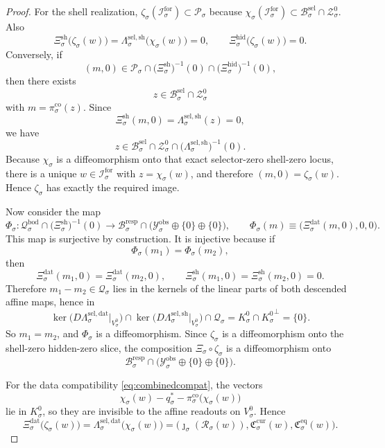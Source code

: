 \documentclass[11pt]{article}
\newcommand{\ForSpace}[1]{\mathcal I_{#1}^{\mathrm{for}}}
\newcommand{\Reduction}[1]{\mathcal R_{#1}}
\newcommand{\CurrentCarrier}[1]{\mathfrak C_{#1}^{\mathrm{cur}}}
\newcommand{\EqCarrier}[1]{\mathfrak C_{#1}^{\mathrm{eq}}}
\newcommand{\DataSpace}[1]{\mathcal Y_{#1}^{\mathrm{obs}}}
\newcommand{\ProtoBody}[1]{\mathcal P_{#1}}
\newcommand{\ResponseMap}[1]{\Xi_{#1}}
\newcommand{\ResponseData}[1]{\Xi_{#1}^{\mathrm{dat}}}
\newcommand{\ResponseShell}[1]{\Xi_{#1}^{\mathrm{sh}}}
\newcommand{\ResponseHidden}[1]{\Xi_{#1}^{\mathrm{hid}}}
\newcommand{\ResponseImage}[1]{\mathcal B_{#1}^{\mathrm{resp}}}
\newcommand{\ProtoEmbed}[1]{\zeta_{#1}}
\newcommand{\GenBody}[1]{\mathcal B_{#1}^{\mathrm{sel}}}
\newcommand{\GenData}[1]{\Lambda_{#1}^{\mathrm{sel,dat}}}
\newcommand{\GenShell}[1]{\Lambda_{#1}^{\mathrm{sel,sh}}}
\newcommand{\ZeroHiddenSlice}[1]{\mathcal Z_{#1}^{0}}
\newcommand{\ZeroHiddenVec}[1]{V_{#1}^{0}}
\newcommand{\GenEmbed}[1]{\chi_{#1}}
\newcommand{\Kernel}[1]{K_{#1}^{0}}
\newcommand{\CoreState}[1]{\mathcal Q_{#1}}
\newcommand{\ReferencePoint}[1]{q_{#1}^{\ast}}
\newcommand{\CoreCoord}[1]{\pi_{#1}^{\mathrm{co}}}
\newcommand{\CoreBody}[1]{\mathcal Q_{#1}^{\mathrm{bod}}}
\begin{document}
\begin{proof}
For the shell realization, \(\ProtoEmbed{\sigma}(\ForSpace{\sigma})\subset\ProtoBody{\sigma}\) because \(\GenEmbed{\sigma}(\ForSpace{\sigma})\subset\GenBody{\sigma}\cap\ZeroHiddenSlice{\sigma}\). Also
\[
\ResponseShell{\sigma}\bigl(\ProtoEmbed{\sigma}(w)\bigr)
=
\GenShell{\sigma}\bigl(\GenEmbed{\sigma}(w)\bigr)
=
0,
\qquad
\ResponseHidden{\sigma}\bigl(\ProtoEmbed{\sigma}(w)\bigr)=0.
\]
Conversely, if
\[
(m,0)\in
\ProtoBody{\sigma}\cap
\bigl(\ResponseShell{\sigma}\bigr)^{-1}(0)\cap
\bigl(\ResponseHidden{\sigma}\bigr)^{-1}(0),
\]
then there exists
\[
z\in\GenBody{\sigma}\cap\ZeroHiddenSlice{\sigma}
\]
with \(m=\CoreCoord{\sigma}(z)\). Since
\[
\ResponseShell{\sigma}(m,0)
=
\GenShell{\sigma}(z)
=
0,
\]
we have
\[
z\in
\GenBody{\sigma}\cap
\ZeroHiddenSlice{\sigma}\cap
\bigl(\GenShell{\sigma}\bigr)^{-1}(0).
\]
Because \(\GenEmbed{\sigma}\) is a diffeomorphism onto that exact selector-zero shell-zero locus, there is a unique \(w\in\ForSpace{\sigma}\) with \(z=\GenEmbed{\sigma}(w)\), and therefore \((m,0)=\ProtoEmbed{\sigma}(w)\). Hence \(\ProtoEmbed{\sigma}\) has exactly the required image.

Now consider the map
\[
\Phi_{\sigma}:
\CoreBody{\sigma}\cap
\bigl(\ResponseShell{\sigma}\bigr)^{-1}(0)
\to
\ResponseImage{\sigma}\cap
\bigl(
\DataSpace{\sigma}\oplus\{0\}\oplus\{0\}
\bigr),
\qquad
\Phi_{\sigma}(m)
\equiv
\bigl(
\ResponseData{\sigma}(m,0),
0,
0
\bigr).
\]
This map is surjective by construction. It is injective because if
\[
\Phi_{\sigma}(m_{1})=\Phi_{\sigma}(m_{2}),
\]
then
\[
\ResponseData{\sigma}(m_{1},0)=\ResponseData{\sigma}(m_{2},0),
\qquad
\ResponseShell{\sigma}(m_{1},0)=\ResponseShell{\sigma}(m_{2},0)=0.
\]
Therefore \(m_{1}-m_{2}\in\CoreState{\sigma}\) lies in the kernels of the linear parts of both descended affine maps, hence in
\[
\ker\bigl(D\GenData{\sigma}\big|_{\ZeroHiddenVec{\sigma}}\bigr)
\cap
\ker\bigl(D\GenShell{\sigma}\big|_{\ZeroHiddenVec{\sigma}}\bigr)
\cap
\CoreState{\sigma}
=
\Kernel{\sigma}\cap{\Kernel{\sigma}}^{\perp}
=
\{0\}.
\]
So \(m_{1}=m_{2}\), and \(\Phi_{\sigma}\) is a diffeomorphism. Since \(\ProtoEmbed{\sigma}\) is a diffeomorphism onto the shell-zero hidden-zero slice, the composition \(\ResponseMap{\sigma}\circ\ProtoEmbed{\sigma}\) is a diffeomorphism onto
\[
\ResponseImage{\sigma}\cap
\bigl(
\DataSpace{\sigma}\oplus\{0\}\oplus\{0\}
\bigr).
\]

For the data compatibility \eqref{eq:combinedcompat}, the vectors
\[
\GenEmbed{\sigma}(w)-\ReferencePoint{\sigma}-\CoreCoord{\sigma}\bigl(\GenEmbed{\sigma}(w)\bigr)
\]
lie in \(\Kernel{\sigma}\), so they are invisible to the affine readouts on \(\ZeroHiddenVec{\sigma}\). Hence
\[
\ResponseData{\sigma}\bigl(\ProtoEmbed{\sigma}(w)\bigr)
=
\GenData{\sigma}\bigl(\GenEmbed{\sigma}(w)\bigr)
=
\bigl(
\jmath_{\sigma}(\Reduction{\sigma}(w)),
\CurrentCarrier{\sigma}(w),
\EqCarrier{\sigma}(w)
\bigr).
\]


\end{proof}
\end{document}
